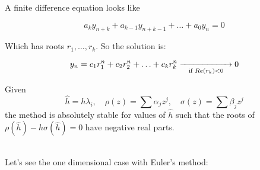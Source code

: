 \newpage

A finite difference equation looks like

\[
  a_ky_{n+k} + a_{k-1}y_{n+k-1} + \ldots + a_0y_n = 0
\]

Which has roots $r_1,\ldots,r_k$. So the solution is:

\[
  y_n = c_1r_1^n + c_2r_2^n + \ldots + c_kr_k^n \underset{\text{if } Re(r_k)<0}{\xrightarrow{\hspace*{2cm}}} 0
\]

\begin{prop}
    Given $$\hat{h} = h\lambda_i, \quad \rho(z) = \sum\alpha_jz^j, \quad \sigma(z) = \sum\beta_jz^j$$
    the method is absolutely stable for values of $\hat{h}$ such that the roots of $\rho(\hat{h}) - h\sigma(\hat{h}) = 0$ have negative real parts.
\end{prop}
\-\\
Let's see the one dimensional case with Euler's method:

\usetikzlibrary[patterns]

